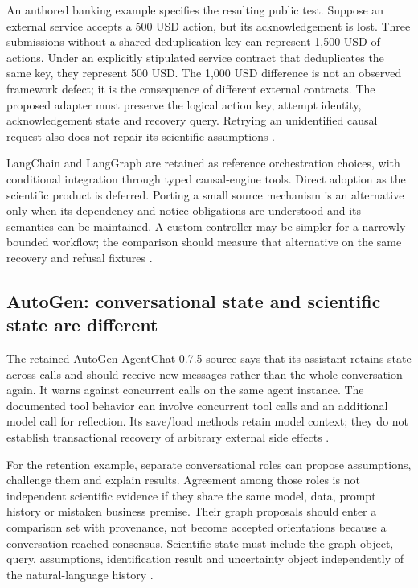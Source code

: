 An authored banking example specifies the resulting public test. Suppose
an external service accepts a 500 USD action, but its acknowledgement is
lost. Three submissions without a shared deduplication key can represent
1,500 USD of actions. Under an explicitly stipulated service contract
that deduplicates the same key, they represent 500 USD. The 1,000 USD
difference is not an observed framework defect; it is the consequence
of different external contracts. The proposed adapter must preserve the
logical action key, attempt identity, acknowledgement state and recovery
query. Retrying an unidentified causal request also does not repair its
scientific assumptions \cite{exec24_framework_contracts}.

LangChain and LangGraph are retained as reference orchestration choices,
with conditional integration through typed causal-engine tools. Direct
adoption as the scientific product is deferred. Porting a small source
mechanism is an alternative only when its dependency and notice obligations
are understood and its semantics can be maintained. A custom controller
may be simpler for a narrowly bounded workflow; the comparison should
measure that alternative on the same recovery and refusal fixtures
\cite{exec24_framework_contracts}.

\subsection{AutoGen: conversational state and scientific state are different}
The retained AutoGen AgentChat 0.7.5 source says that its assistant retains
state across calls and should receive new messages rather than the whole
conversation again. It warns against concurrent calls on the same agent
instance. The documented tool behavior can involve concurrent tool calls
and an additional model call for reflection. Its save/load methods retain
model context; they do not establish transactional recovery of arbitrary
external side effects
\cite{v12_la04_autogen}.

For the retention example, separate conversational roles can propose
assumptions, challenge them and explain results. Agreement among those
roles is not independent scientific evidence if they share the same
model, data, prompt history or mistaken business premise. Their graph
proposals should enter a comparison set with provenance, not become
accepted orientations because a conversation reached consensus. Scientific
state must include the graph object, query, assumptions, identification
result and uncertainty object independently of the natural-language history
\cite{exec24_framework_contracts}.

